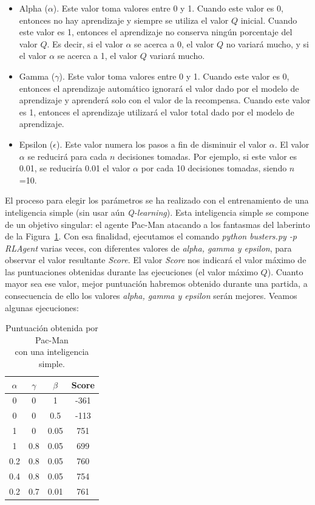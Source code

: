 \documentclass[11pt]{exam}
\begin{document}
\begin{itemize}
	\item Alpha ($\alpha$). Este valor toma valores entre 0 y 1. Cuando este valor es 0, entonces no hay aprendizaje y siempre se utiliza el valor $Q$ inicial. Cuando este valor es 1, entonces el aprendizaje no conserva ningún porcentaje del valor $Q$. Es decir, si el valor $\alpha$ se acerca a 0, el valor $Q$ no variará mucho, y si el valor $\alpha$ se acerca a 1, el valor $Q$ variará mucho.
	
	\item Gamma ($\gamma$). Este valor toma valores entre 0 y 1. Cuando este valor es 0, entonces el aprendizaje automático ignorará el valor dado por el modelo de aprendizaje y aprenderá solo con el valor de la recompensa. Cuando este valor es 1, entonces el aprendizaje utilizará el valor total dado por el modelo de aprendizaje.
	
	\item Epsilon ($\epsilon$). Este valor numera los pasos a fin de disminuir el valor $\alpha$. El valor $\alpha$ se reducirá para cada $n$ decisiones tomadas. Por ejemplo, si este valor es 0.01, se reduciría 0.01 el valor $\alpha$ por cada 10 decisiones tomadas, siendo $n$=10.
\end{itemize}

El proceso para elegir los parámetros  se ha realizado con el entrenamiento de una inteligencia simple (sin usar aún \textit{Q-learning}). Esta inteligencia simple se compone de un objetivo singular: el agente Pac-Man atacando a los fantasmas del laberinto de la Figura~\ref{score}. Con esa finalidad, ejecutamos el comando \textit{python busters.py -p RLAgent} varias veces, con diferentes valores de \textit{alpha, gamma y epsilon}, para observar el valor resultante \textit{Score}. El valor \textit{Score} nos indicará el valor máximo de las puntuaciones obtenidas durante las ejecuciones (el valor máximo $Q$). Cuanto mayor sea ese valor, mejor puntuación habremos obtenido durante una partida, a consecuencia de ello los valores \textit{alpha, gamma y epsilon} serán mejores. Veamos algunas ejecuciones:
\vspace*{2mm}

\begin{table}[H]
	\centering
	\begin{tabular}{|c|c|c|c|}
		\hline
		$\alpha$ & $\gamma$ & $\beta$ & Score \\ \hline \hline
		0   & 0   & 1    &  -361 \\ \hline
		0   & 0   & 0.5  &  -113 \\ \hline
		1   & 0   & 0.05 &  751 \\ \hline
		1   & 0.8 & 0.05 &  699 \\ \hline
		0.2 & 0.8 & 0.05 &  760 \\ \hline
		0.4 & 0.8 & 0.05 &  754 \\ \hline
		0.2 & 0.7 & 0.01 &  761 \\ \hline
	\end{tabular}
	\caption{Puntuación obtenida por Pac-Man \\ con una inteligencia simple.}
	\label{score}
\end{table}
\end{document}
